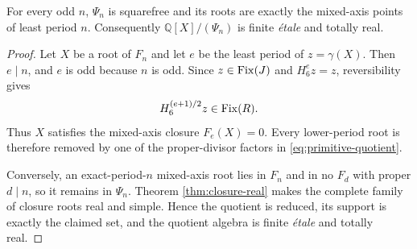 \begin{theorem}\label{thm:primitive-effectivity}
For every odd $n$, $\Psi_n$ is squarefree and its roots are exactly the
mixed-axis points of least period $n$.  Consequently
$\mathbb Q[X]/(\Psi_n)$ is finite \emph{\'etale} and totally real.
\end{theorem}

\begin{proof}
Let $X$ be a root of $F_n$ and let $e$ be the least period of
$z=\gamma(X)$.  Then $e\mid n$, and $e$ is odd because $n$ is odd.  Since
$z\in\operatorname{Fix}(J)$ and $H_6^e z=z$, reversibility gives
\[
H_6^{(e+1)/2}z\in\operatorname{Fix}(R).
\]
Thus $X$ satisfies the mixed-axis closure $F_e(X)=0$.  Every lower-period
root is therefore removed by one of the proper-divisor factors in
\eqref{eq:primitive-quotient}.

Conversely, an exact-period-$n$ mixed-axis root lies in $F_n$ and in no
$F_d$ with proper $d\mid n$, so it remains in $\Psi_n$.  Theorem
\ref{thm:closure-real} makes the complete family of closure roots real and
simple.  Hence the quotient is reduced, its support is exactly the claimed
set, and the quotient algebra is finite \emph{\'etale} and totally real.
\end{proof}
